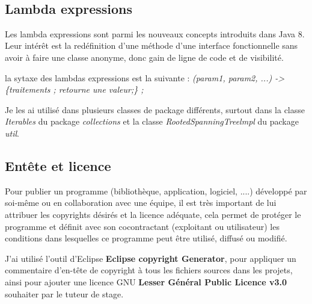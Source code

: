 \documentclass[12pt]{report}
\begin{document}
\newpage
~\\
\subsection{Lambda expressions}


Les lambda expressions sont parmi les nouveaux concepts introduits dans Java 8. Leur intérêt est la redéfinition d'une méthode d'une interface fonctionnelle sans avoir à faire une classe anonyme, donc gain de ligne de code et de visibilité.\newline

la sytaxe des lambdas expressions est la suivante :\newline
\textit{(param1, param2, ...) -> \{traitements ; retourne une valeur;\} ;} \newline

Je les ai utilisé dans plusieurs classes de package différents, surtout dans la classe \textit{Iterables} du package \textit{collections} et la classe \textit{RootedSpanningTreelmpl} du package \textit{util}.\newline

\subsection{Entête et licence}

Pour publier un programme (bibliothèque, application, logiciel, ....) développé par soi-même ou en collaboration avec une équipe, il est très important de lui attribuer les copyrights désirés et la licence adéquate, cela permet de protéger le programme et définit avec son cocontractant (exploitant ou utilisateur) les conditions dans lesquelles ce programme peut être utilisé, diffusé ou modifié.\newline

J'ai utilisé l'outil d'Eclipse \textbf{Eclipse copyright Generator}, pour appliquer un commentaire d'en-tête de copyright à tous les fichiers sources dans les projets, ainsi pour ajouter une licence GNU \textbf{Lesser Général Public Licence v3.0} souhaiter par le tuteur de stage.\newline 
\end{document}
